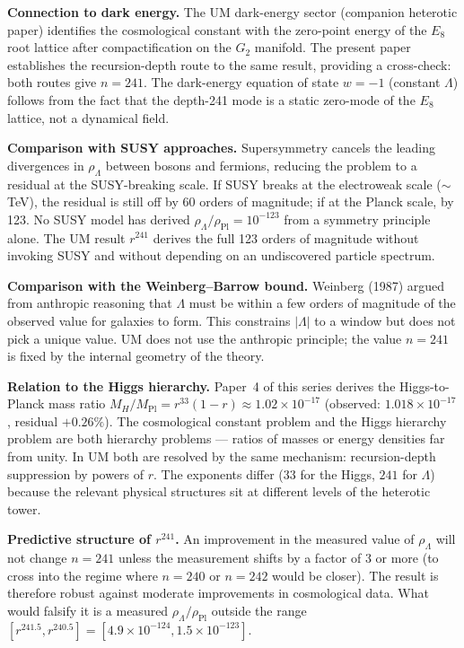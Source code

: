 \documentclass[12pt]{article}
\begin{document}
\textbf{Connection to dark energy.}
The UM dark-energy sector (companion heterotic paper) identifies
the cosmological constant with the zero-point energy of the
$E_8$ root lattice after compactification on the $G_2$ manifold.
The present paper establishes the recursion-depth route to the
same result, providing a cross-check: both routes give $n = 241$.
The dark-energy equation of state $w = -1$ (constant $\Lambda$)
follows from the fact that the depth-241 mode is a static
zero-mode of the $E_8$ lattice, not a dynamical field.

\textbf{Comparison with SUSY approaches.}
Supersymmetry cancels the leading divergences in $\rho_\Lambda$
between bosons and fermions, reducing the problem to a residual
at the SUSY-breaking scale.  If SUSY breaks at the electroweak
scale ($\sim$TeV), the residual is still off by 60 orders of
magnitude; if at the Planck scale, by 123.  No SUSY model has
derived $\rho_\Lambda/\rho_{\text{Pl}} = 10^{-123}$ from a
symmetry principle alone.  The UM result $r^{241}$ derives the
full 123 orders of magnitude without invoking SUSY and without
depending on an undiscovered particle spectrum.

\textbf{Comparison with the Weinberg--Barrow bound.}
Weinberg (1987) argued from anthropic reasoning that $\Lambda$
must be within a few orders of magnitude of the observed value
for galaxies to form.  This constrains $|\Lambda|$ to a window
but does not pick a unique value.  UM does not use the anthropic
principle; the value $n = 241$ is fixed by the internal geometry
of the theory.

\textbf{Relation to the Higgs hierarchy.}
Paper~4 of this series derives the Higgs-to-Planck mass ratio
$M_H/M_{\text{Pl}} = r^{33}(1-r) \approx 1.02 \times 10^{-17}$
(observed: $1.018 \times 10^{-17}$, residual $+0.26\%$).  The
cosmological constant problem and the Higgs hierarchy problem are
both hierarchy problems --- ratios of masses or energy densities
far from unity.  In UM both are resolved by the same mechanism:
recursion-depth suppression by powers of $r$.  The exponents
differ ($33$ for the Higgs, $241$ for $\Lambda$) because the
relevant physical structures sit at different levels of the
heterotic tower.

\textbf{Predictive structure of $r^{241}$.}
An improvement in the measured value of $\rho_\Lambda$ will not
change $n = 241$ unless the measurement shifts by a factor of 3
or more (to cross into the regime where $n = 240$ or $n = 242$
would be closer).  The result is therefore robust against moderate
improvements in cosmological data.  What would falsify it is a
measured $\rho_\Lambda/\rho_{\text{Pl}}$ outside the range
$[r^{241.5}, r^{240.5}] = [4.9 \times 10^{-124}, 1.5 \times 10^{-123}]$.
\end{document}
